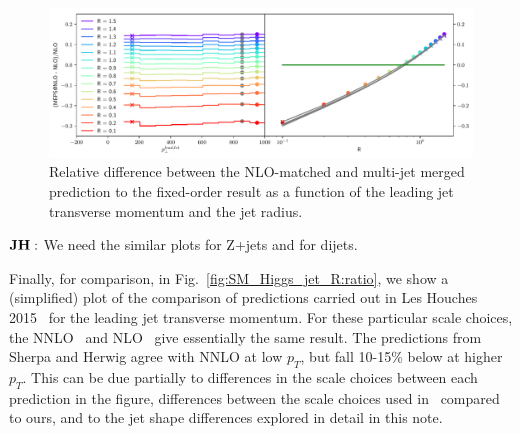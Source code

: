\documentclass[aps,prd,onecolumn,fleqn,superscriptaddress,groupedaddress,nofootinbib,preprintnumbers,nobalancelastpage]{revtex4}
\begin{document}
\begin{figure}[t]
  \centerline{\includegraphics[width=\textwidth]{plots/zhjets_Fig8}}
  \caption{Relative difference between the NLO-matched and multi-jet merged
    prediction to the fixed-order result as a function of the leading jet transverse
    momentum and the jet radius.\label{fig:SM_Higgs_jet_R:ps_vs_fo_rpt_higgs}}
\end{figure}

$\bf JH:$ We need the similar plots for Z+jets and for dijets. 

Finally, for comparison, in Fig.~\ref{fig:SM_Higgs_jet_R:ratio}, we show a (simplified) plot
of the comparison of predictions carried out in Les Houches
2015~\cite{Badger:2016bpw} for the leading jet transverse momentum.  For these
particular scale choices, the NNLO~\cite{Boughezal:2015aha} and
NLO~\cite{vanDeurzen:2013rv,Cullen:2013saa,Greiner:2015jha} give essentially the
same result. The predictions from Sherpa and Herwig agree with NNLO at low
$p_T$, but fall 10-15\% below at higher $p_T$.  This can be due partially to
differences in the scale choices between each prediction in the figure,
differences between the scale choices used in~\cite{Badger:2016bpw} compared to
ours, and to the jet shape differences explored in detail in this note.
\end{document}
